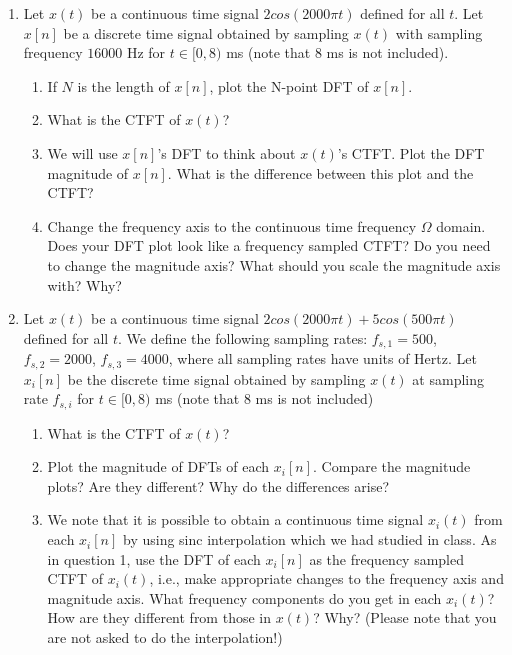 \begin{enumerate}
\item Let $x(t)$ be a continuous time signal $2cos(2000\pi t)$ defined for all $t$. Let $x[n]$ be a discrete time signal obtained by sampling $x(t)$ with sampling frequency $16000$ Hz for $t \in [0, 8)$ ms (note that $8$ ms is not included).
  \begin{enumerate}
  \item If $N$ is the length of $x[n]$, plot the N-point DFT of $x[n]$.
  \item What is the CTFT of $x(t)$?
  \item We will use $x[n]$'s DFT to think about $x(t)$'s CTFT. Plot the DFT magnitude of $x[n]$. What is the difference between this plot and the CTFT?
  \item Change the frequency axis to the continuous time frequency $\Omega$ domain. Does your DFT plot look like a frequency sampled CTFT? Do you need to change the magnitude axis? What should you scale the magnitude axis with? Why?
  \end{enumerate}
  
\item Let $x(t)$ be a continuous time signal $2cos(2000\pi t) + 5cos(500\pi t)$ defined for all $t$. We define the following sampling rates: $f_{s,1} = 500$, $f_{s,2} = 2000$, $f_{s,3} = 4000$, where all sampling rates have units of Hertz. Let $x_{i}[n]$ be the discrete time signal obtained by sampling $x(t)$ at sampling rate $f_{s, i}$ for $t \in [0, 8)$ ms (note that $8$ ms is not included)
  \begin{enumerate}
  \item What is the CTFT of $x(t)$?
  \item Plot the magnitude of DFTs of each $x_{i}[n]$. Compare the magnitude plots? Are they different? Why do the differences arise?
  \item We note that it is possible to obtain a continuous time signal $x_{i}(t)$ from each $x_{i}[n]$ by using sinc interpolation which we had studied in class. As in question 1, use the DFT of each $x_{i}[n]$ as the frequency sampled CTFT of $x_{i}(t)$, i.e., make appropriate changes to the frequency axis and magnitude axis. What frequency components do you get in each $x_{i}(t)$? How are they different from those in $x(t)$? Why? (Please note that you are not asked to do the interpolation!)
  \end{enumerate}


\end{enumerate}

